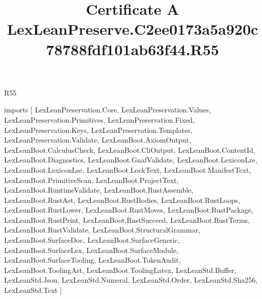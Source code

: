 \begin{lexlean}{R55}
\title{Certificate A LexLeanPreserve.C2ee0173a5a920c78788fdf101ab63f44.R55}
\begin{coremodule}
imports [
  LexLeanPreservation.Core,
  LexLeanPreservation.Values,
  LexLeanPreservation.Primitives,
  LexLeanPreservation.Fixed,
  LexLeanPreservation.Keys,
  LexLeanPreservation.Templates,
  LexLeanPreservation.Validate,
  LexLeanBoot.AxiomOutput,
  LexLeanBoot.CalculusCheck,
  LexLeanBoot.CliOutput,
  LexLeanBoot.ContentId,
  LexLeanBoot.Diagnostics,
  LexLeanBoot.GnafValidate,
  LexLeanBoot.LexiconLre,
  LexLeanBoot.LexiconLse,
  LexLeanBoot.LockText,
  LexLeanBoot.ManifestText,
  LexLeanBoot.PrimitiveScan,
  LexLeanBoot.ProjectText,
  LexLeanBoot.RuntimeValidate,
  LexLeanBoot.RustAssemble,
  LexLeanBoot.RustAst,
  LexLeanBoot.RustBodies,
  LexLeanBoot.RustLoops,
  LexLeanBoot.RustLower,
  LexLeanBoot.RustMoves,
  LexLeanBoot.RustPackage,
  LexLeanBoot.RustPrint,
  LexLeanBoot.RustSucceed,
  LexLeanBoot.RustTerms,
  LexLeanBoot.RustValidate,
  LexLeanBoot.StructuralGrammar,
  LexLeanBoot.SurfaceDoc,
  LexLeanBoot.SurfaceGeneric,
  LexLeanBoot.SurfaceLex,
  LexLeanBoot.SurfaceModule,
  LexLeanBoot.SurfaceTooling,
  LexLeanBoot.TokenAudit,
  LexLeanBoot.ToolingAst,
  LexLeanBoot.ToolingLatex,
  LexLeanStd.Buffer,
  LexLeanStd.Json,
  LexLeanStd.Numeral,
  LexLeanStd.Order,
  LexLeanStd.Sha256,
  LexLeanStd.Text
]


\end{coremodule}
\end{lexlean}
